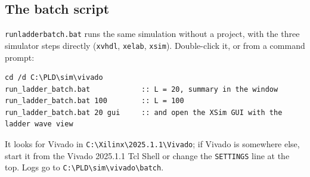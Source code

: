 \documentclass[11pt,a4paper]{article}
\newcommand{\code}[1]{\texttt{#1}}
\newcommand{\bs}{\textbackslash\allowbreak{}}
\renewcommand{\_}{\oldunderscore\allowbreak{}}
\newcommand{\pld}[1]{\code{C:\bs PLD\bs #1}}
\newcommand{\menu}[1]{\textsf{#1}}
\begin{document}
\subsection{The batch script}\label{sec:batchrun}
\code{run\_ladder\_batch.bat} runs the same simulation without a project, with the three simulator steps directly (\code{xvhdl}, \code{xelab}, \code{xsim}). Double-click it, or from a command prompt:
\begin{lstlisting}
cd /d C:\PLD\sim\vivado
run_ladder_batch.bat            :: L = 20, summary in the window
run_ladder_batch.bat 100        :: L = 100
run_ladder_batch.bat 20 gui     :: and open the XSim GUI with the ladder wave view
\end{lstlisting}
It looks for Vivado in \code{C:\bs Xilinx\bs 2025.1.1\bs Vivado}; if Vivado is somewhere else, start it from the \menu{Vivado 2025.1.1 Tcl Shell} or change the \code{SETTINGS} line at the top. Logs go to \pld{sim\bs vivado\bs batch}.

\end{document}
